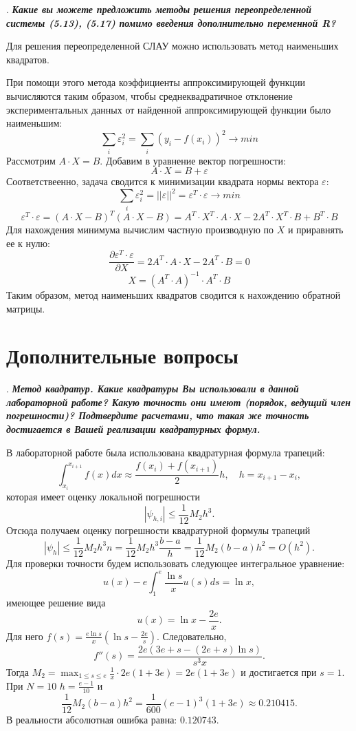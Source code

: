 \documentclass[12pt, a4paper]{article}
\newcounter{mycounter}
\newcommand{\question}[1]{%
	\stepcounter{mycounter}%
	\textbf{\themycounter}.  %
	\textbf{\textit{#1}}
	
}
\begin{document}
	\bigskip
	\question{Какие вы можете предложить методы решения переопределенной системы (5.13), (5.17) помимо введения дополнительно переменной R?}
	
		Для решения переопределенной СЛАУ можно использовать метод наименьших квадратов.
	
	При помощи этого метода коэффициенты аппроксимирующей функции вычисляются таким образом, чтобы среднеквадратичное отклонение экспериментальных данных от найденной аппроксимирующей функции было наименьшим:
	\[
	\sum_{i} \varepsilon_i^2 = \sum_{i} (y_i - f(x_i))^2 \rightarrow min
	\]
	Рассмотрим $A \cdot X = B$. Добавим в уравнение вектор погрешности:
	\[
	A \cdot X = B + \varepsilon
	\]
	Соответствеенно, задача сводится к минимизации квадрата нормы вектора $\varepsilon$:
	\[
	\sum_{i} \varepsilon_i^2 = || \varepsilon ||^2 = \varepsilon^T \cdot \varepsilon \rightarrow min
	\]
	\[
	\varepsilon^T \cdot \varepsilon = (A \cdot X - B)^T (A \cdot X - B) = A^T \cdot X^T \cdot A \cdot X - 2 A^T \cdot X^T \cdot B + B^T \cdot B
	\]
	Для нахождения минимума вычислим частную производную по $X$ и приравнять ее к нулю:
	\[
	\frac{\partial \varepsilon^T \cdot \varepsilon}{\partial X} = 2 A^T \cdot A \cdot X - 2 A^T \cdot B = 0
	\]
	\[
	X = (A^T \cdot A)^{-1} \cdot A^T \cdot B
	\]
	Таким образом, метод наименьших квадратов сводится к нахождению обратной матрицы.

	
	\clearpage
	\section{Дополнительные вопросы}
	
	\question{Метод квадратур. Какие квадратуры Вы использовали в данной лабораторной работе? Какую точность они имеют (порядок, ведущий член погрешности)? Подтвердите расчетами, что такая же точность достигается в Вашей реализации квадратурных формул.}
	
	
	В лабораторной работе была использована квадратурная формула трапеций:
	\[
	\int_{x_i}^{x_{i+1}} f(x) dx \approx \frac{f(x_i) + f(x_{i+1})}{2} h, \quad h = x_{i+1} - x_i,
	\]
	которая имеет оценку локальной погрешности
	\[
	|\psi_{h,i}| \le \frac{1}{12} M_2 h^3.
	\]
	Отсюда получаем оценку погрешности квадратурной формулы трапеций
	\[
	|\psi_h| \le \frac{1}{12} M_2 h^3 n = \frac{1}{12} M_2 h^3 \frac{b - a}{h} = \frac{1}{12} M_2 (b - a) h^2 = O(h^2).
	\]
	Для проверки точности будем использовать следующее интегральное уравнение:
	\[
	u(x) - e \int_1^e \frac{\ln s}{x} u(s) ds = \ln x,
	\]
	имеющее решение вида
	\[
	u(x) = \ln x - \frac{2e}{x}.
	\]
	Для него $f(s) = \frac{e \ln s}{x} \left( \ln s - \frac{2e}{s} \right)$. Следовательно,
	\[
	f''(s) = \frac{2e (3e + s - (2e + s) \ln s)}{s^3 x}.
	\]
	Тогда $M_2 = \max_{1 \le s \le e} \frac{1}{x} \cdot 2e (1 + 3e) = 2e (1 + 3e)$ и достигается при $s = 1$. При $N = 10$ $h = \frac{e - 1}{10}$ и
	\[
	\frac{1}{12} M_2 (b - a) h^2 = \frac{1}{600} (e - 1)^3 (1 + 3e) \approx 0.210415.
	\]
	В реальности абсолютная ошибка равна: $0.120743$.
	
\end{document}
